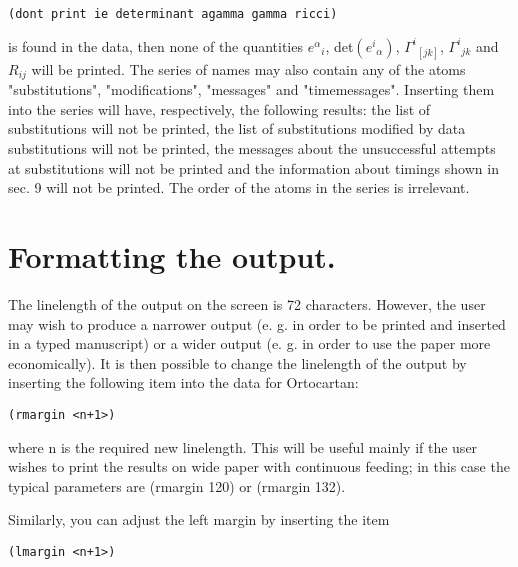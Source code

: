 \bigskip

\begin{verbatim}
(dont print ie determinant agamma gamma ricci)
\end{verbatim}

\bigskip

\noindent is found in the data, then none  of  the  quantities
${e^{\alpha}}_i$, det$({e^i}_{\alpha})$, ${\Gamma^i}_{[jk]}$, ${\Gamma^i}_{jk}$
and $R_{ij}$ will be printed. The series of names may also contain any of the
atoms "substitutions", "modifications", "messages" and "timemessages".
Inserting them into the series will have, respectively, the following  results:
the list of substitutions will not be printed, the list of substitutions
modified by data substitutions will not be printed,  the messages about the
unsuccessful attempts at substitutions will not be printed and the information
about timings shown in sec. 9 will not be printed. The order of the atoms  in
the series is irrelevant.

\section{Formatting the output.}

The linelength of the output on the screen is 72 characters.  However,  the
user may wish to produce a narrower
     output (e. g. in order to be printed and inserted in a typed
     manuscript) or a wider output (e. g. in  order  to  use  the
     paper  more economically). It is then possible to change the
     linelength of the output by  inserting  the  following  item
     into the data for Ortocartan:

\bigskip

\begin{verbatim}
(rmargin <n+1>)
\end{verbatim}

\bigskip

\noindent where n is the required new linelength. This will be useful mainly if
the user wishes to print the results on wide paper with continuous feeding; in
this case the typical parameters are (rmargin 120) or (rmargin 132).

Similarly, you can adjust the left margin by  inserting
     the item

\bigskip

\begin{verbatim}
(lmargin <n+1>)
\end{verbatim}

\bigskip

